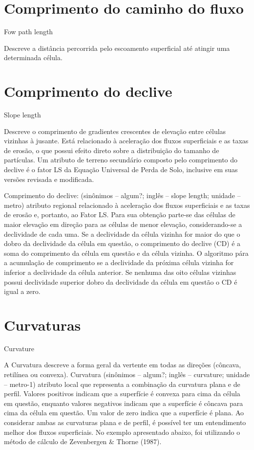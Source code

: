 \documentclass[]{book}
\begin{document}
\section{Comprimento do caminho do
ﬂuxo}\label{comprimento-do-caminho-do-uxo}

Fow path length

Descreve a distância percorrida pelo escoamento superﬁcial até atingir
uma determinada célula.

\section{Comprimento do declive}\label{comprimento-do-declive}

Slope length

Descreve o comprimento de gradientes crescentes de elevação entre
células vizinhas à jusante. Está relacionado à aceleração dos fluxos
superficiais e as taxas de erosão, o que possui efeito direto sobre a
distribuição do tamanho de partículas. Um atributo de terreno secundário
composto pelo comprimento do declive é o fator LS da Equação Universal
de Perda de Solo, inclusive em suas versões revisada e modificada.

Comprimento do declive: (sinônimos -- algum?; inglês -- slope length;
unidade -- metro) atributo regional relacionado à aceleração dos fluxos
superficiais e as taxas de erosão e, portanto, ao Fator LS. Para sua
obtenção parte-se das células de maior elevação em direção para as
células de menor elevação, considerando-se a declividade de cada uma. Se
a declividade da célula vizinha for maior do que o dobro da declividade
da célula em questão, o comprimento do declive (CD) é a soma do
comprimento da célula em questão e da célula vizinha. O algoritmo pára a
acumulação de comprimento se a declividade da próxima célula vizinha for
inferior a declividade da célula anterior. Se nenhuma das oito células
vizinhas possui declividade superior dobro da declividade da célula em
questão o CD é igual a zero.

\section{Curvaturas}\label{curvaturas}

Curvature

A Curvatura descreve a forma geral da vertente em todas as direções
(côncava, retilínea ou convexa). Curvatura (sinônimos -- algum?; inglês
-- curvature; unidade -- metro-1) atributo local que representa a
combinação da curvatura plana e de perfil. Valores positivos indicam que
a superfície é convexa para cima da célula em questão, enquanto valores
negativos indicam que a superfície é côncava para cima da célula em
questão. Um valor de zero indica que a superfície é plana. Ao considerar
ambas as curvaturas plana e de perfil, é possível ter um entendimento
melhor dos fluxos superficiais. No exemplo apresentado abaixo, foi
utilizando o método de cálculo de Zevenbergen \& Thorne (1987).
\end{document}
